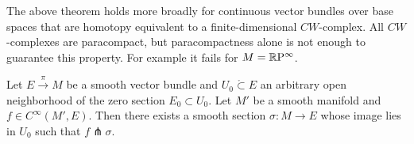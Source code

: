 \begin{rem}
    The above theorem holds more broadly for continuous vector bundles over base spaces that are homotopy equivalent to a finite-dimensional $CW$-complex. All $CW$-complexes are paracompact, but paracompactness alone is not enough to guarantee this property. For example it fails for $M=\mathbb{R}\mathrm{P}^\infty$.
\end{rem}

\begin{thm}\label{transverse section thm}
Let $E\overset{\pi}{\to}M$ be a smooth vector bundle and $U_0\mathring{\subset}E$ an arbitrary open neighborhood of the zero section $E_0\subset U_0$. Let $M'$ be a smooth manifold and $f\in C^\infty(M',E)$. Then there exists a smooth section $\sigma:M\to E$ whose image lies in $U_0$ such that $f\pitchfork \sigma$.
\end{thm}
